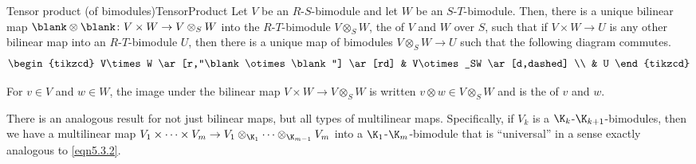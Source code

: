 \begin{thm}{Tensor product (of bimodules)}{TensorProduct}
	Let $V$ be an $R$-$S$-bimodule and let $W$ be an $S$-$T$-bimodule.  Then, there is a unique bilinear map $\blank \otimes \blank \colon V\times W\rightarrow V\otimes _SW$ into the $R$-$T$-bimodule $V\otimes _SW$, the  of $V$ and $W$ over $S$, such that if $V\times W\rightarrow U$ is any other bilinear map into an $R$-$T$-bimodule $U$, then there is a unique map of bimodules $V\otimes _SW\rightarrow U$ such that the following diagram commutes.
	\begin{equation}\label{eqn5.3.2}
		\begin{tikzcd}
			V\times W \ar[r,"\blank \otimes \blank "] \ar[rd] & V\otimes _SW \ar[d,dashed] \\
			& U
		\end{tikzcd}
	\end{equation}
	\begin{rmk}
		For $v\in V$ and $w\in W$, the image under the bilinear map $V\times W\rightarrow V\otimes _SW$ is written $v\otimes w\in V\otimes _SW$ and is the  of $v$ and $w$.
	\end{rmk}
	\begin{rmk}
		There is an analogous result for not just bilinear maps, but all types of multilinear maps.  Specifically, if $V_k$ is a $\K _k$-$\K _{k+1}$-bimodules, then we have a multilinear map $V_1\times \cdots \times V_m\rightarrow V_1\otimes _{\K _1}\cdots \otimes _{\K _{m-1}}V_m$ into a $\K _1$-$\K _m$-bimodule that is ``universal'' in a sense exactly analogous to \eqref{eqn5.3.2}.
		

\end{rmk}
\end{thm}
